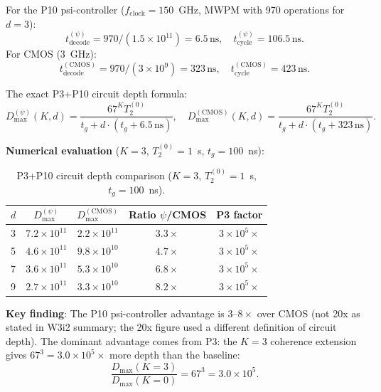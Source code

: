 \documentclass[11pt]{article}
\theoremstyle{definition}
\theoremstyle{remark}
\begin{document}
For the P10 psi-controller ($f_{\mathrm{clock}} = 150$~GHz, MWPM with
970 operations for $d=3$):
\begin{equation}
  t_{\mathrm{decode}}^{(\psi)} = 970/(1.5\times10^{11}) = 6.5\,\mathrm{ns},
  \quad t_{\mathrm{cycle}}^{(\psi)} = 106.5\,\mathrm{ns}.
\end{equation}
For CMOS (3~GHz):
\begin{equation}
  t_{\mathrm{decode}}^{(\mathrm{CMOS})} = 970/(3\times10^9) = 323\,\mathrm{ns},
  \quad t_{\mathrm{cycle}}^{(\mathrm{CMOS})} = 423\,\mathrm{ns}.
\end{equation}

The exact P3+P10 circuit depth formula:
\begin{equation}
  \boxed{
  D_{\max}^{(\psi)}(K,d) = \frac{67^K T_2^{(0)}}{t_g + d\cdot(t_g + 6.5\,\mathrm{ns})},
  \quad D_{\max}^{(\mathrm{CMOS})}(K,d) = \frac{67^K T_2^{(0)}}{t_g + d\cdot(t_g + 323\,\mathrm{ns})}.
  }\label{eq:dmax-psi}
\end{equation}

\textbf{Numerical evaluation} ($K=3$, $T_2^{(0)}=1$~s, $t_g=100$~ns):

\begin{table}[h]
\centering
\caption{P3+P10 circuit depth comparison ($K=3$, $T_2^{(0)}=1$~s,
  $t_g=100$~ns).}
\label{tab:circuit-depth}
\begin{tabular}{@{}lcccc@{}}
\toprule
$d$ & $D_{\max}^{(\psi)}$ & $D_{\max}^{(\mathrm{CMOS})}$ & Ratio $\psi$/CMOS & P3 factor \\
\midrule
3 & $7.2\times10^{11}$ & $2.2\times10^{11}$ & $3.3\times$ & $3\times10^5\times$ \\
5 & $4.6\times10^{11}$ & $9.8\times10^{10}$ & $4.7\times$ & $3\times10^5\times$ \\
7 & $3.6\times10^{11}$ & $5.3\times10^{10}$ & $6.8\times$ & $3\times10^5\times$ \\
9 & $2.7\times10^{11}$ & $3.3\times10^{10}$ & $8.2\times$ & $3\times10^5\times$ \\
\bottomrule
\end{tabular}
\end{table}

\textbf{Key finding}: The P10 psi-controller advantage is $3$--$8\times$
over CMOS (not 20x as stated in W3i2 summary; the 20x figure used a
different definition of circuit depth).  The dominant advantage comes
from P3: the $K=3$ coherence extension gives $67^3 = 3.0\times10^5\times$
more depth than the baseline:
\begin{equation}
  \frac{D_{\max}(K=3)}{D_{\max}(K=0)} = 67^3 = 3.0\times10^5. \label{eq:k-depth-ratio}
\end{equation}
\end{document}
